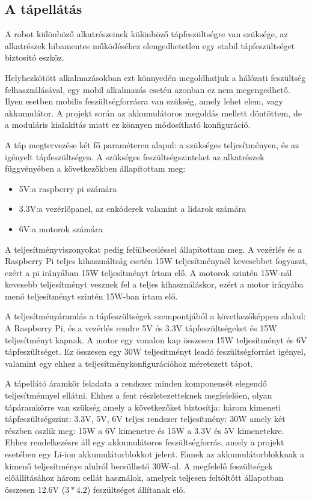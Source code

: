 
\subsection{A tápellátás}

A robot különböző alkatrészeinek különböző tápfeszültségre van szüksége, az
alkatrészek hibamentes működéséhez elengedhetetlen egy stabil tápfeszültséget
biztosító eszköz.

Helyhezkötött alkalmazásokban ezt könnyedén megoldhatjuk a hálózati feszültség
felhasználásával, egy mobil alkalmazás esetén azonban ez nem megengedhető. Ilyen
esetben mobilis feszültségforrásra van szükség, amely lehet elem, vagy
akkumulátor. A projekt során az akkumulátoros megoldás mellett döntöttem, de
a moduláris kialakítás miatt ez könnyen módosítható konfiguráció.

\medskip

A táp megtervezése két fő paraméteren alapul: a szükséges teljesítményen, és az
igényelt tápfeszültségen. A szükséges feszültségszinteket az alkatrészek
függvényében a következőkben állapítottam meg:

\begin{itemize}
\item 5V:\@ a raspberry pi számára
\item 3.3V:\@ a vezérlőpanel, az enkóderek valamint a lidarok számára
\item 6V:\@ a motorok számára
\end{itemize}

A teljesítményviszonyokat pedig felülbecsléssel állapítottam meg. A vezérlés és
a Raspberry Pi teljes kihasználtság esetén 15W teljesítménynél kevesebbet
fogyaszt, ezért a pi irányában 15W teljesítményt írtam elő. A motorok szintén
15W-nál kevesebb teljesítményt vesznek fel a teljes kihasználáskor, ezért a motor
irányába menő teljesítményt szintén 15W-ban írtam elő.

A teljesítményáramlás a tápfeszültségek szempontjából a következőképpen alakul:
A Raspberry Pi, és a vezérlés rendre 5V és 3.3V tápfeszültségeket és 15W
teljesítményt kapnak. A motor egy vonalon kap összesen 15W teljesítményt és 6V
tápfeszültséget. Ez összesen egy 30W teljesítményt leadó feszültségforrást
igényel, valamint egy ehhez a teljesítménykonfigurációhoz méretezett tápot.

A tápellátó áramkör feladata a rendszer minden komponensét elegendő
teljesítménnyel ellátni. Ehhez a fent részletezetteknek megfelelően, olyan
tápáramkörre van szükség amely a következőket biztosítja: három kimeneti
tápfeszültségszint: 3.3V, 5V, 6V teljes rendszer
teljesítmény: 30W amely két részben oszlik meg: 15W a
6V kimenetre és 15W a 3.3V és 5V kimenetekre.
Ehhez rendelkezésre áll egy akkumulátoros feszültségforrás, amely a projekt
esetében egy Li-ion akkumulátorblokkot jelent. Ennek az akkumulátorblokknak a
kimenő teljesítménye alulról becsülhető 30W-al. A megfelelő feszültségek
előállításához három cellát használok, amelyek teljesen feltöltött állapotban
összesen 12.6V (\(3 * 4.2\)) feszültséget állítanak elő.

